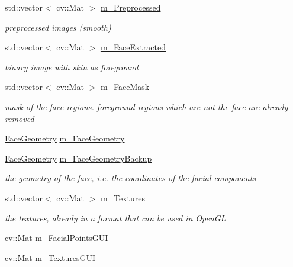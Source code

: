 \begin{DoxyCompactItemize}
std\+::vector$<$ cv\+::\+Mat $>$ \hyperlink{class_face3_d_1_1_detection_a022bcdfdcfab58bcd2bb4f448d583b3c}{m\+\_\+\+Preprocessed}
\begin{DoxyCompactList}\small\item\em preprocessed images (smooth) \end{DoxyCompactList}\item 
std\+::vector$<$ cv\+::\+Mat $>$ \hyperlink{class_face3_d_1_1_detection_a835e20dfe0fc3c9cee63168c4467dd82}{m\+\_\+\+Face\+Extracted}
\begin{DoxyCompactList}\small\item\em binary image with skin as foreground \end{DoxyCompactList}\item 
std\+::vector$<$ cv\+::\+Mat $>$ \hyperlink{class_face3_d_1_1_detection_a4dff33b175f5b2aff949db62e4c95b88}{m\+\_\+\+Face\+Mask}
\begin{DoxyCompactList}\small\item\em mask of the face regions. foreground regions which are not the face are already removed \end{DoxyCompactList}\item 
\hyperlink{class_face3_d_1_1_face_geometry}{Face\+Geometry} \hyperlink{class_face3_d_1_1_detection_a4eed1e18b8465d43d75102bf10ce8575}{m\+\_\+\+Face\+Geometry}
\item 
\hyperlink{class_face3_d_1_1_face_geometry}{Face\+Geometry} \hyperlink{class_face3_d_1_1_detection_a45ddf526188a8eb73de53bc2029c66f6}{m\+\_\+\+Face\+Geometry\+Backup}
\begin{DoxyCompactList}\small\item\em the geometry of the face, i.\+e. the coordinates of the facial components \end{DoxyCompactList}\item 
std\+::vector$<$ cv\+::\+Mat $>$ \hyperlink{class_face3_d_1_1_detection_a5dbd240320bc7a4c1661b63e23bee777}{m\+\_\+\+Textures}
\begin{DoxyCompactList}\small\item\em the textures, already in a format that can be used in Open\+GL \end{DoxyCompactList}\item 
cv\+::\+Mat \hyperlink{class_face3_d_1_1_detection_a7e74ffc6d6f1835f6eceac7b0609012c}{m\+\_\+\+Facial\+Points\+G\+UI}
\item 
cv\+::\+Mat \hyperlink{class_face3_d_1_1_detection_aac17e78111f48d10d80316dc1e0b7e76}{m\+\_\+\+Textures\+G\+UI}
\end{DoxyCompactItemize}
